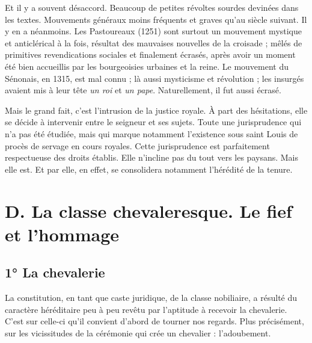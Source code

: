 \documentclass[french,twoside]{book} %
\begin{document}
Et il y a souvent désaccord. Beaucoup de petites révoltes sourdes devinées dans les textes. Mouvements généraux moins fréquents et graves qu’au siècle suivant. Il y en a néanmoins. Les Pastoureaux (1251) sont surtout un mouvement mystique et anticlérical à la fois, résultat des mauvaises nouvelles de la croisade ; mêlés de primitives revendications sociales et finalement écrasés, après avoir un moment été bien accueillis par les bourgeoisies urbaines et la reine. Le mouvement du Sénonais, en 1315, est mal connu ; là aussi mysticisme et révolution ; les insurgés avaient mis à leur tête \emph{un roi} et \emph{un pape}. Naturellement, il fut aussi écrasé.\par
Mais le grand fait, c’est l’intrusion de la justice royale. À part des hésitations, elle se décide à intervenir entre le seigneur et ses sujets. Toute une jurisprudence qui n’a pas été étudiée, mais qui marque notamment l’existence sous saint Louis de procès de servage en cours royales. Cette jurisprudence est parfaitement respectueuse des droits établis. Elle n’incline pas du tout vers les paysans. Mais elle est. Et par elle, en effet, se consolidera notamment l’hérédité de la tenure.
\section[D. La classe chevaleresque. Le fief et l’hommage]{D. La classe chevaleresque. Le fief et l’hommage}
\label{c07d}
\subsection[1° La chevalerie]{1° La chevalerie \protect\footnotemark}
\noindent La constitution, en tant que caste juridique, de la classe nobiliaire, a résulté du caractère héréditaire peu à peu revêtu par l’aptitude à recevoir la chevalerie. C’est sur celle-ci qu’il convient d’abord de tourner nos regards. Plus précisément, sur les vicissitudes de la cérémonie qui crée un chevalier : l’adoubement.\par
\end{document}
